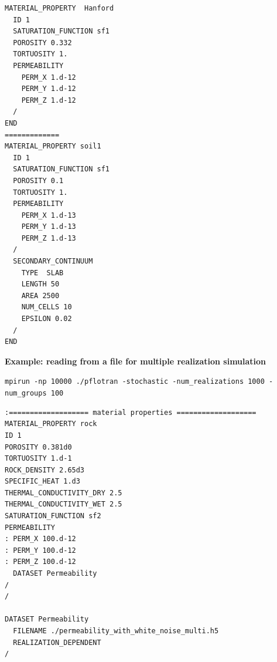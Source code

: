 \documentclass[12pt]{article}
\begin{document}

\begin{mdframed}

\begin{verbatim}
MATERIAL_PROPERTY  Hanford
  ID 1
  SATURATION_FUNCTION sf1
  POROSITY 0.332
  TORTUOSITY 1.
  PERMEABILITY
    PERM_X 1.d-12
    PERM_Y 1.d-12
    PERM_Z 1.d-12
  /
END
=============
MATERIAL_PROPERTY soil1
  ID 1 
  SATURATION_FUNCTION sf1
  POROSITY 0.1
  TORTUOSITY 1.
  PERMEABILITY
    PERM_X 1.d-13
    PERM_Y 1.d-13
    PERM_Z 1.d-13
  /
  SECONDARY_CONTINUUM
    TYPE  SLAB
    LENGTH 50
    AREA 2500
    NUM_CELLS 10
    EPSILON 0.02
  /
END
\end{verbatim}

\noindent
{\bf Example: reading from a file for multiple realization simulation}

{\scriptsize\tt mpirun -np 10000 ./pflotran -stochastic -num\_realizations 1000 -num\_groups 100}

\begin{verbatim}
:=================== material properties ===================
MATERIAL_PROPERTY rock
ID 1
POROSITY 0.381d0
TORTUOSITY 1.d-1
ROCK_DENSITY 2.65d3
SPECIFIC_HEAT 1.d3
THERMAL_CONDUCTIVITY_DRY 2.5
THERMAL_CONDUCTIVITY_WET 2.5 
SATURATION_FUNCTION sf2
PERMEABILITY
: PERM_X 100.d-12
: PERM_Y 100.d-12
: PERM_Z 100.d-12
  DATASET Permeability
/
/

DATASET Permeability
  FILENAME ./permeability_with_white_noise_multi.h5
  REALIZATION_DEPENDENT
/

\end{verbatim}
\end{mdframed}

\hyperlink{target_key}{\return}

\end{document}
